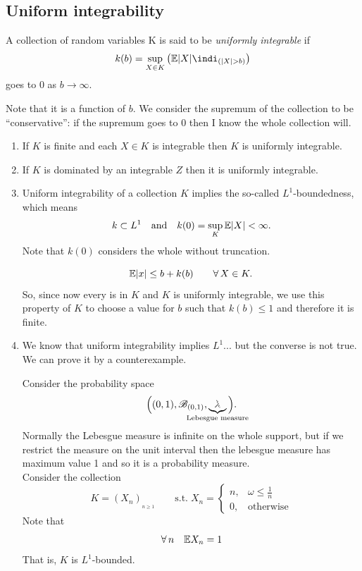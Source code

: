 \documentclass{report}
\begin{document}
\subsection{Uniform integrability}
\begin{definition}
	A collection of random variables K is said to be \emph{uniformly integrable} if
	\[k(b)=\sup_{X\in K}\left(\ev|X|\indi_{(|X|>b)}\right)\]
	goes to 0 as $b\to\infty$. 
\end{definition}
Note that it is a function of $b$. We consider the supremum of the collection to be ``conservative'': if the supremum goes to 0 then I know the whole collection will.
\begin{remark}
	\begin{enumerate}[\circnum]
		\item If $K$ is finite and each $X\in K$ is integrable then $K$ is uniformly integrable.
		\item If $K$ is dominated by an integrable \rv{} $Z$ then it is uniformly integrable.
		\item Uniform integrability of a collection $K$ implies the so-called $L^{1}$-boundedness, which means
		\[k\subset L^{1}\quad\text{and}\quad k(0)=\sup_{K}\mathbb{E} |X|<\infty.\]
		Note that $k(0)$ considers the whole \rv{} without truncation.
		\begin{fancyproof}
			\[\mathbb{E}|x|\leq b+k(b)\qquad \forall\, X\in K.\]
			So, since now every \rv{} is in $K$ and $K$ is uniformly integrable, we use this property of $K$ to choose a value for $b$ such that $k(b)\leq 1$ and therefore it is finite.
		\end{fancyproof}
		\item We know that uniform integrability implies $L^{1}$... but the converse is not true. We can prove it by a counterexample.
		\begin{fancyproof}
			Consider the probability space $$\Big((0,1),\B_{(0,1)},\underbrace{\leb}_{\mathclap{\text{Lebesgue measure}}}\Big).$$ Normally the Lebesgue measure is infinite on the whole support, but if we restrict the measure on the unit interval then the lebesgue measure has maximum value 1 and so it is a probability measure.\\
			Consider the collection
			\[K=(X_n)_{_{n\geq1}}\qquad\mathrm{s.t.}\;X_n=\begin{cases}
				n, &\omega\leq\frac{1}{n}\\
				0,  &\mathrm{otherwise}
			\end{cases}\]
			Note that \[
			\forall\, n\quad\mathbb{E} X_n=1
			\]
			That is, $K$ is $L^{1}$-bounded.\\

\end{fancyproof}
\end{enumerate}
\end{remark}
\end{document}
